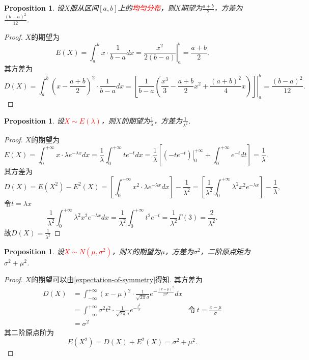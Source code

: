 \documentclass{article}
\newtheorem{proposition}[theorem]{Proposition}
\newcommand{\redt}[1]{\textcolor{red}{#1}}
\begin{document}
\begin{proposition}
\rm 设$X$服从区间$[a,b]$上的\redt{均匀分布}，则$X$期望为$\frac{a+b}{2}$，方差为$\frac{(b-a)^2}{12}$.
\end{proposition}

\begin{proof}
\rm $X$的期望为
$$
E(X) = \int_{a}^{b} x\cdot\frac{1}{b-a}dx = \left. \frac{x^2}{2(b-a)} \right\vert_{a}^{b} = \frac{a+b}{2}. 
$$
其方差为
$$
D(X) = \int_{a}^{b} \left(x-\frac{a+b}{2}\right)^2 \cdot\frac{1}{b-a}dx = \left. \left[ \frac{1}{b-a} \left( \frac{x^3}{3} - \frac{a+b}{2}x^2 +\frac{(a+b)^2}{4}x  \right)\right]\right\vert_{a}^{b} = \frac{(b-a)^2}{12}.
$$
\end{proof}

\begin{proposition}
\rm 设\redt{$X \sim E(\lambda)$}，则$X$的期望为$\frac{1}{\lambda}$，方差为$\frac{1}{\lambda^2}$. 
\end{proposition}

\begin{proof}
$X$的期望为
$$
E(X) = \int_{0}^{+\infty} x\cdot \lambda e^{-\lambda x} dx = \frac{1}{\lambda}\int_{0}^{+\infty} t e^{-t} dx = \frac{1}{\lambda} \left[ \left. (-te^{-t}) \right\vert_{0}^{+\infty} + \int_{0}^{+\infty} e^{-t}dt \right] = \frac{1}{\lambda}.
$$
其方差为
$$
D(X) = E(X^2) - E^2(X) = \left[\int_{0}^{+\infty} x^2 \cdot \lambda e^{-\lambda x} dx \right] - \frac{1}{\lambda^2} = \left[ \frac{1}{\lambda^2} \int_{0}^{+\infty} \lambda^2 x^2 e^{-\lambda x}\right]-\frac{1}{\lambda},
$$
令$t = \lambda x$
$$
\frac{1}{\lambda^2} \int_{0}^{+\infty} \lambda^2 x^2 e^{-\lambda x}dx = \frac{1}{\lambda^2} \int_{0}^{+\infty} t^2e^{-t} = \frac{1}{\lambda^2} \Gamma(3) =\frac{2}{\lambda^2}.
$$
故$D(X)=\frac{1}{\lambda^2}$
\end{proof}

\begin{proposition}
\rm 设\redt{$X \sim N(\mu,\sigma^2)$}，则$X$的期望为$\mu$，方差为$\sigma^2$，二阶原点矩为$\sigma^2+\mu^2$.
\end{proposition}

\begin{proof}
$X$的期望可以由\ref{expectation-of-symmetry}得知. 其方差为
$$
\begin{array}{llr}
D(X) &= \int_{-\infty}^{+\infty} (x-\mu)^2 \cdot \frac{1}{\sqrt{2\pi}\sigma} e^{-\frac{(x-\mu)^2}{2\sigma^2}}dx  \\
&= \int_{-\infty}^{+\infty} \sigma^2 t^2 \cdot \frac{1}{\sqrt{2\pi}\sigma} e^{-\frac{t^2}{2}} & \text{令}~t=\frac{x-\mu}{\sigma} \\
&=\sigma^2
\end{array}
$$
其二阶原点阶为
$$
E(X^2) = D(X)+E^2(X) =  \sigma^2 + \mu^2.
$$
\end{proof}
\end{document}
